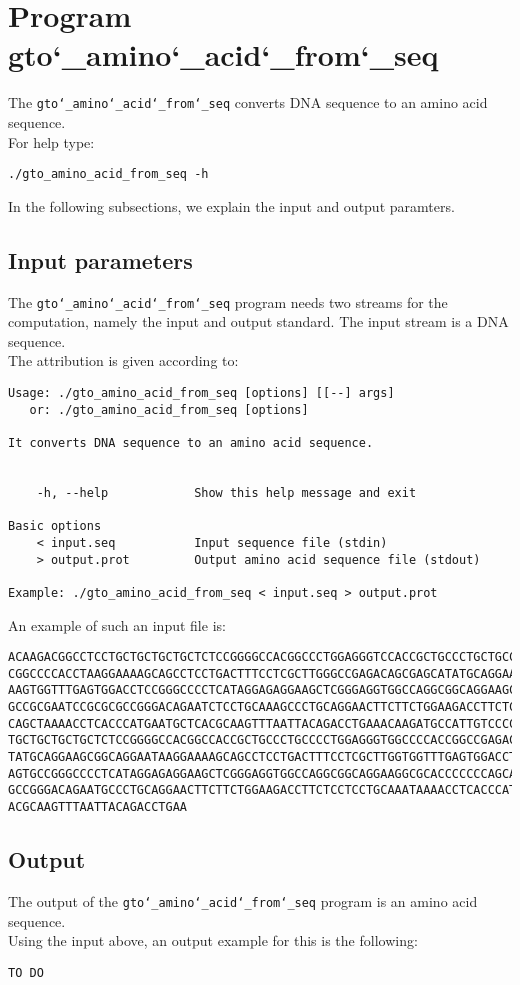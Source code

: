 \section{Program gto\char`_amino\char`_acid\char`_from\char`_seq}
The \texttt{gto\char`_amino\char`_acid\char`_from\char`_seq} converts DNA sequence to an amino acid sequence.\\
For help type:
\begin{lstlisting}
./gto_amino_acid_from_seq -h
\end{lstlisting}
In the following subsections, we explain the input and output paramters.

\subsection*{Input parameters}

The \texttt{gto\char`_amino\char`_acid\char`_from\char`_seq} program needs two streams for the computation, namely the input and output standard. The input stream is a DNA sequence.\\
The attribution is given according to:
\begin{lstlisting}
Usage: ./gto_amino_acid_from_seq [options] [[--] args]
   or: ./gto_amino_acid_from_seq [options]

It converts DNA sequence to an amino acid sequence.


    -h, --help            Show this help message and exit

Basic options
    < input.seq           Input sequence file (stdin)
    > output.prot         Output amino acid sequence file (stdout)

Example: ./gto_amino_acid_from_seq < input.seq > output.prot
\end{lstlisting}
An example of such an input file is:
\begin{lstlisting}
ACAAGACGGCCTCCTGCTGCTGCTGCTCTCCGGGGCCACGGCCCTGGAGGGTCCACCGCTGCCCTGCTGCCATTGTCCC
CGGCCCCACCTAAGGAAAAGCAGCCTCCTGACTTTCCTCGCTTGGGCCGAGACAGCGAGCATATGCAGGAAGCGGCAGG
AAGTGGTTTGAGTGGACCTCCGGGCCCCTCATAGGAGAGGAAGCTCGGGAGGTGGCCAGGCGGCAGGAAGCAGGCCAGT
GCCGCGAATCCGCGCGCCGGGACAGAATCTCCTGCAAAGCCCTGCAGGAACTTCTTCTGGAAGACCTTCTCCACCCCCC
CAGCTAAAACCTCACCCATGAATGCTCACGCAAGTTTAATTACAGACCTGAAACAAGATGCCATTGTCCCCCGGCCTCC
TGCTGCTGCTGCTCTCCGGGGCCACGGCCACCGCTGCCCTGCCCCTGGAGGGTGGCCCCACCGGCCGAGACAGCGAGCA
TATGCAGGAAGCGGCAGGAATAAGGAAAAGCAGCCTCCTGACTTTCCTCGCTTGGTGGTTTGAGTGGACCTCCCAGGCC
AGTGCCGGGCCCCTCATAGGAGAGGAAGCTCGGGAGGTGGCCAGGCGGCAGGAAGGCGCACCCCCCCAGCAATCCGCGC
GCCGGGACAGAATGCCCTGCAGGAACTTCTTCTGGAAGACCTTCTCCTCCTGCAAATAAAACCTCACCCATGAATGCTC
ACGCAAGTTTAATTACAGACCTGAA
\end{lstlisting}

\subsection*{Output}

The output of the \texttt{gto\char`_amino\char`_acid\char`_from\char`_seq} program is an amino acid sequence.\\
Using the input above, an output example for this is the following:
\begin{lstlisting}
TO DO
\end{lstlisting}
